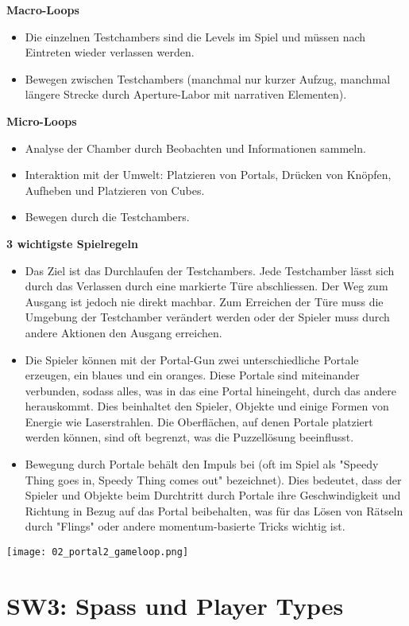 \documentclass{article}
\begin{document}
\bigskip
\textbf{Macro-Loops}
\begin{itemize}
    \item Die einzelnen Testchambers sind die Levels im Spiel und müssen nach Eintreten wieder verlassen werden.
    \item Bewegen zwischen Testchambers (manchmal nur kurzer Aufzug, manchmal längere Strecke durch Aperture-Labor mit narrativen
    Elementen).
\end{itemize}
\bigskip
\textbf{Micro-Loops}
\begin{itemize}
    \item Analyse der Chamber durch Beobachten und Informationen sammeln.
    \item Interaktion mit der Umwelt: Platzieren von Portals, Drücken von Knöpfen, Aufheben und Platzieren von Cubes.
    \item Bewegen durch die Testchambers.
\end{itemize}
\bigskip
\textbf{3 wichtigste Spielregeln}
\begin{itemize}
    \item Das Ziel ist das Durchlaufen der Testchambers. Jede Testchamber lässt sich durch das Verlassen durch eine markierte Türe
    abschliessen. Der Weg zum Ausgang ist jedoch nie direkt machbar. Zum Erreichen der Türe muss die Umgebung der Testchamber
    verändert werden oder der Spieler muss durch andere Aktionen den Ausgang erreichen.
    \item Die Spieler können mit der Portal-Gun zwei unterschiedliche Portale erzeugen, ein blaues und ein oranges. Diese Portale
    sind miteinander verbunden, sodass alles, was in das eine Portal hineingeht, durch das andere herauskommt. Dies beinhaltet den
    Spieler, Objekte und einige Formen von Energie wie Laserstrahlen. Die Oberflächen, auf denen Portale platziert werden können,
    sind oft begrenzt, was die Puzzellösung beeinflusst.
    \item Bewegung durch Portale behält den Impuls bei (oft im Spiel als "Speedy Thing goes in, Speedy Thing comes out" bezeichnet).
    Dies bedeutet, dass der Spieler und Objekte beim Durchtritt durch Portale ihre Geschwindigkeit und Richtung in Bezug auf das
    Portal beibehalten, was für das Lösen von Rätseln durch "Flings" oder andere momentum-basierte Tricks wichtig ist.
\end{itemize}

\texttt{[image: 02\_portal2\_gameloop.png]}

\section{SW3: Spass und Player Types}
\end{document}
